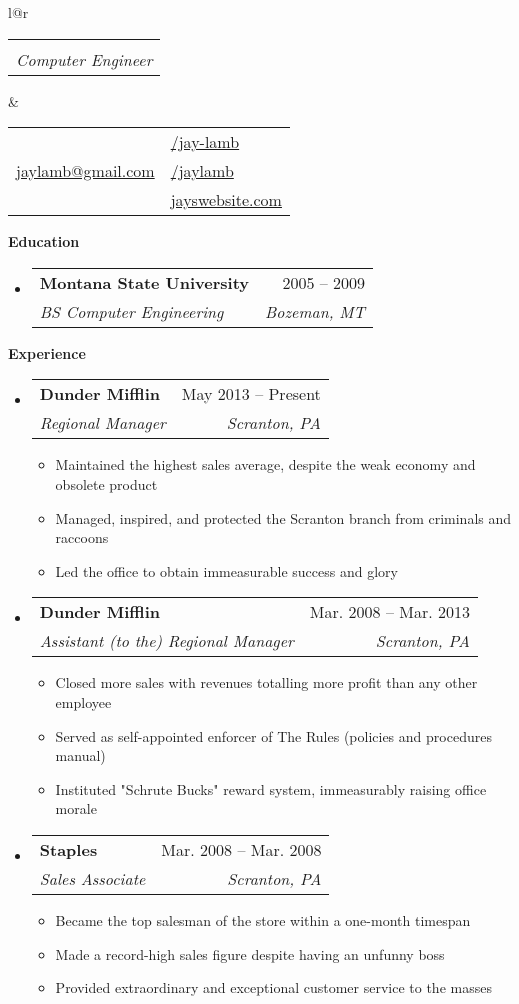 \documentclass[letterpaper,12pt]{article}
\makeatletter
\def \fullname {Jay D. Lamb}
\def \subtitle {Computer Engineer}
\def \linkedinicon {\faLinkedin}
\def \linkedinlink {www.linkedin.com/in/jay-lamb-032166174/}
\def \linkedintext {/jay-lamb}
\def \phoneicon {\faPhone}
\def \phonetext {+1-406-598-4072}
\def \emailicon {\faEnvelope}
\def \emaillink {mailto:jaylamb@gmail.com}
\def \emailtext {jaylamb@gmail.com}
\def \githubicon {\faGithub}
\def \githublink {https://github.com/jaylamb}
\def \githubtext {/jaylamb}
\def \websiteicon {\faGlobe}
\def \websitelink {https://google.com/}
\def \websitetext {jayswebsite.com}
\def \headertype {\doublecol} %
\def \entryspacing {-0pt}
\def \linkedin {\linkedinicon \hspace{3pt}\href{\linkedinlink}{\linkedintext}}
\def \phone {\phoneicon \hspace{3pt}{ \phonetext}}
\def \email {\emailicon \hspace{3pt}\href{\emaillink}{\emailtext}}
\def \github {\githubicon \hspace{3pt}\href{\githublink}{\githubtext}}
\def \website {\websiteicon \hspace{3pt}\href{\websitelink}{\websitetext}}
\renewcommand{\section}[2]{\vspace{5pt}
  \colorbox{secondary}{\color{white}\raggedbottom\normalsize\textbf{{#1}{\hspace{7pt}#2}}}
}
\newcommand{\resumeEntryStart}{\begin{itemize}[leftmargin=2.5mm]}
\newcommand{\resumeEntryEnd}{\end{itemize}\vspace{\entryspacing}}
\newcommand{\resumeItemListStart}{\begin{itemize}[leftmargin=4.5mm]}
\newcommand{\resumeItemListEnd}{\end{itemize}}
\newcommand{\resumeItem}[1]{
  \item\small{
    {#1 \vspace{-2pt}}
  }
}
\newcommand{\resumeEntryTSDL}[4]{
  \vspace{-1pt}\item[]
    \begin{tabular*}{0.97\textwidth}{l@{\extracolsep{\fill}}r}
      \textbf{\color{primary}#1} & {\firabook\color{accent}\small#2} \\
      \textit{\color{accent}\small#3} & \textit{\color{accent}\small#4} \\
    \end{tabular*}\vspace{-6pt}
}
\newcommand{\doublecol}[6]{
  \begin{tabular*}{\textwidth}{l@{\extracolsep{\fill}}r}
    {
      \begin{tabular}[c]{l}
        \fontsize{35}{45}\selectfont{\color{primary}{{\textbf{\fullname}}}} \\
        {\textit{\subtitle}} %
      \end{tabular}
    } & {
      \begin{tabular}[c]{l@{\hspace{1.5em}}l}
        {\small#4} & {\small#1} \\
        {\small#5} & {\small#2} \\
        {\small#6} & {\small#3}
      \end{tabular}
    }
  \end{tabular*}
}
\newcommand{\singlecol}[6]{
  \begin{tabular*}{\textwidth}{l@{\extracolsep{\fill}}r}
    {
      \begin{tabular}[b]{l}
        \fontsize{35}{45}\selectfont{\color{primary}{{\textbf{\fullname}}}} \\
        {\textit{\subtitle}} %
      \end{tabular}
    } & {
      \begin{tabular}[c]{l}
        {\small#1} \\
        {\small#2} \\
        {\small#3} \\
        {\small#4} \\
        {\small#5} \\
        {\small#6}
      \end{tabular}
    }
  \end{tabular*}
}
\makeatother
\begin{document}

\headertype{\linkedin}{\github}{\website}{\phone}{\email}{} %

\section{\faGraduationCap}{Education}

  \resumeEntryStart
    \resumeEntryTSDL
      {Montana State University}{2005 -- 2009}
      {BS Computer Engineering}{Bozeman, MT}
  \resumeEntryEnd

\section{\faPieChart}{Experience}

  \resumeEntryStart
    \resumeEntryTSDL
      {Dunder Mifflin}{May 2013 -- Present}
      {Regional Manager}{Scranton, PA}
    \resumeItemListStart
      \resumeItem {Maintained the highest sales average, despite the weak economy and obsolete product}
      \resumeItem {Managed, inspired, and protected the Scranton branch from criminals and raccoons}
      \resumeItem {Led the office to obtain immeasurable success and glory}
    \resumeItemListEnd
  \resumeEntryEnd

  \resumeEntryStart
    \resumeEntryTSDL
      {Dunder Mifflin}{Mar. 2008 -- Mar. 2013}
      {Assistant (to the) Regional Manager}{Scranton, PA}
    \resumeItemListStart
      \resumeItem {Closed more sales with revenues totalling more profit than any other employee}
      \resumeItem {Served as self-appointed enforcer of The Rules (policies and procedures manual)}
      \resumeItem {Instituted "Schrute Bucks" reward system, immeasurably raising office morale}
    \resumeItemListEnd
  \resumeEntryEnd

  \resumeEntryStart
    \resumeEntryTSDL
      {Staples}{Mar. 2008 -- Mar. 2008}
      {Sales Associate}{Scranton, PA}
    \resumeItemListStart
        \resumeItem {Became the top salesman of the store within a one-month timespan}
        \resumeItem {Made a record-high sales figure despite having an unfunny boss}
        \resumeItem {Provided extraordinary and exceptional customer service to the masses}
    \resumeItemListEnd
  \resumeEntryEnd
\end{document}
